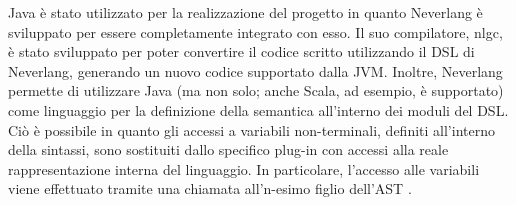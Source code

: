 \documentclass[12pt,a4paper,openright,twoside]{book}
\begin{document}
Java è stato utilizzato per la realizzazione del progetto in quanto Neverlang è sviluppato per essere completamente integrato con esso.
Il suo compilatore, nlgc, è stato sviluppato per poter convertire il codice scritto utilizzando il DSL di Neverlang, generando un nuovo codice
supportato dalla \ac{JVM}. Inoltre, Neverlang permette di utilizzare Java (ma non solo; anche Scala, ad esempio, è supportato) come linguaggio 
per la definizione della semantica all'interno dei moduli del \ac{DSL}. Ciò è possibile in quanto gli accessi a variabili non-terminali, 
definiti all'interno della sintassi, sono sostituiti dallo specifico plug-in con accessi alla reale rappresentazione interna del linguaggio. 
In particolare, l'accesso alle variabili viene effettuato tramite una chiamata all'n-esimo figlio dell'\ac{AST} \cite{Cazzola2013}.








\backmatter




\end{document}
